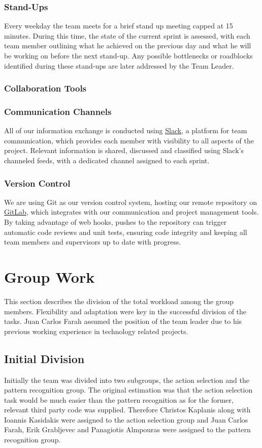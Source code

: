 \documentclass[a4paper,11pt]{article}
\begin{document}
\subsubsection{Stand-Ups}
Every weekday the team meets for a brief stand up meeting capped at 15 minutes. During this time, the state of the current sprint is assessed, with each team member outlining what he achieved on the previous day and what he will be working on before the next stand-up. Any possible bottlenecks or roadblocks identified during these stand-ups are later addressed by the Team Leader.

\subsubsection{Collaboration Tools}

\subsubsection{Communication Channels}
All of our information exchange is conducted using \href{http://slack.com}{Slack}, a platform for team communication, which provides each member with visibility to all aspects of the project. Relevant information is shared, discussed and classified using Slack's channeled feeds, with a dedicated channel assigned to each sprint.

\subsubsection{Version Control}
We are using Git as our version control system, hosting our remote repository on \href{http://gitlab.com}{GitLab}, which integrates with our communication and project management tools. By taking advantage of web hooks, pushes to the repository can trigger automatic code reviews and unit tests, ensuring code integrity and keeping all team members and supervisors up to date with progress.
\clearpage
\section{Group Work}

This section describes the division of the total workload among the group members. Flexibility and adaptation were key in the successful division of the tasks. Juan Carlos Farah assumed the position of the team leader due to his previous working experience in technology related projects.

\subsection{Initial Division}
Initially the team was divided into two subgroups, the action selection and the pattern recognition group. The original estimation was that the action selection task would be much easier than the pattern recognition as for the former, relevant third party code was supplied. Therefore Christos Kaplanis along with Ioannis Kasidakis were assigned to the action selection group and Juan Carlos Farah, Erik Grabljevec and Panagiotis Almpouras were assigned to the pattern recognition group.
\end{document}
